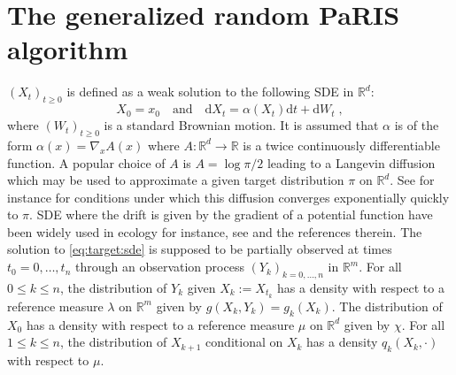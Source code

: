\documentclass[12pt,draft]{article}
\newcommand{\rmd}{\mathrm{d}}
\newcommand{\eqsp}{\;}
\newcommand{\1}{\mathrm{1}}
\newcommand{\qk}{q_{k}}
\begin{document}
\section{The generalized random PaRIS algorithm}
\label{sec:rwparis}
$(X_t)_{t\ge 0}$ is defined as a weak solution to the following SDE in $\mathbb{R}^d$:
\begin{equation}
\label{eq:target:sde}
X_0 = x_0\quad\mbox{and}\quad \rmd X_t = \alpha(X_t)\rmd t + \rmd W_t\eqsp,
\end{equation}
where $(W_t)_{t\ge 0}$ is a standard Brownian motion. It is assumed that $\alpha$ is of the form $\alpha(x) = \nabla_x A(x)$ where $A: \mathbb{R}^d \to \mathbb{R}$ is a twice continuously differentiable function. 
A popular choice of $A$  is $A = \log \pi/2$ leading to a Langevin diffusion which may be used to approximate a given target distribution $\pi$ on $\mathbb{R}^d$. See for instance \cite{roberts:tweedie:1996} for conditions under which this diffusion converges exponentially quickly to $\pi$. 
SDE where the drift is given by the gradient of a potential function have been widely used in ecology for instance, see \cite{brillinger:et:al:2011,harris:blackwell:2013,preisler:et:al:2013} and the references therein. The solution to \eqref{eq:target:sde} is supposed to be partially observed at times $t_0=0,\dots,t_n$ through an observation process $(Y_k)_{k=0,\dots,n}$ in $\mathbb{R}^m$. 
For all $0\le k \le n$, the distribution of $Y_k$ given $X_k:= X_{t_k}$ has a density with respect to a reference measure $\lambda$ on $\mathbb{R}^m$ given by $g(X_k,Y_k) = g_k(X_k)$. 
The distribution of $X_0$ has a density with respect to a reference measure $\mu$ on $\mathbb{R}^d$ given by $\chi$.
For all $1\le k \le n$, the distribution of $X_{k+1} $ conditional on $X_{k}$ has a density $\qk(X_{k},\cdot)$ with respect to $\mu$.
 
\end{document}
